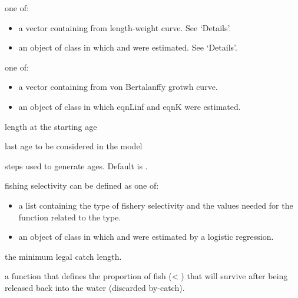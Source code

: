 \documentclass[a4paper]{book}
\begin{document}
\begin{Arguments}
\begin{ldescription}
\item[\code{LW}] one of:
\begin{itemize}

\item a vector containing  from length-weight curve. See `Details'. 
\item an object of class  in which \eqn{\alpha}{} and \eqn{\beta}{} were estimated. See `Details'.        

\end{itemize}


\item[\code{vonB}] one of:
\begin{itemize}

\item a vector containing  from von Bertalanffy grotwh curve.
\item an object of class  in which eqnLinf and eqnK were estimated.      

\end{itemize}


\item[\code{l.start}] length at the starting age

\item[\code{last.age}] last age to be considered in the model

\item[\code{age.step}] steps used to generate ages. Default is .


\item[\code{Fsel.type}] fishing selectivity can be defined as one of:
\begin{itemize}

\item a list containing the type of fishery selectivity and the values needed for the function related to the type.
\item an object of class  in which \eqn{\alpha}{} and \eqn{\beta}{} were estimated by a logistic regression.        

\end{itemize}


\item[\code{fish.lim}] the minimum legal catch length.

\item[\code{prop.surv}] a function that defines the proportion of fish (< ) that will survive after being released back into the water (discarded by-catch).


\end{ldescription}
\end{Arguments}
\end{document}
